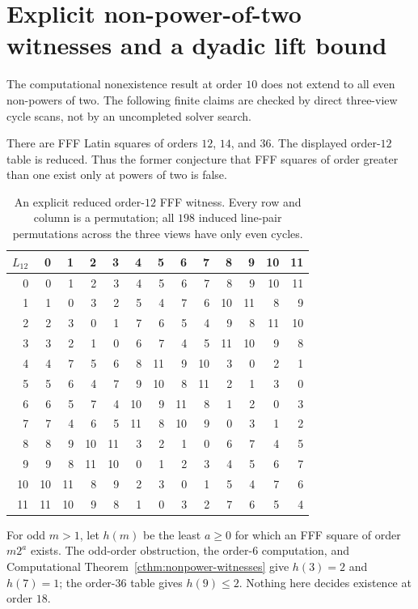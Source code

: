 \section{Explicit non-power-of-two witnesses and a dyadic lift bound}
\label{sec:nonpower-fff}

The computational nonexistence result at order $10$ does not extend to all even
non-powers of two.  The following finite claims are checked by direct
three-view cycle scans, not by an uncompleted solver search.

\begin{computationaltheorem}
\label{cthm:nonpower-witnesses}
There are FFF Latin squares of orders $12$, $14$, and $36$.  The displayed
order-$12$ table is reduced.  Thus the former conjecture that FFF squares
of order greater than one exist only at powers of two is false.
\end{computationaltheorem}

\begin{table}[ht]
\centering
\begingroup\scriptsize\setlength{\tabcolsep}{3pt}
\begin{tabular}{r|*{12}{r}}
$L_{12}$ & 0&1&2&3&4&5&6&7&8&9&10&11 \\ \hline
0  & 0&1&2&3&4&5&6&7&8&9&10&11 \\
1  & 1&0&3&2&5&4&7&6&10&11&8&9 \\
2  & 2&3&0&1&7&6&5&4&9&8&11&10 \\
3  & 3&2&1&0&6&7&4&5&11&10&9&8 \\
4  & 4&7&5&6&8&11&9&10&3&0&2&1 \\
5  & 5&6&4&7&9&10&8&11&2&1&3&0 \\
6  & 6&5&7&4&10&9&11&8&1&2&0&3 \\
7  & 7&4&6&5&11&8&10&9&0&3&1&2 \\
8  & 8&9&10&11&3&2&1&0&6&7&4&5 \\
9  & 9&8&11&10&0&1&2&3&4&5&6&7 \\
10 & 10&11&8&9&2&3&0&1&5&4&7&6 \\
11 & 11&10&9&8&1&0&3&2&7&6&5&4 \\
\end{tabular}
\endgroup
\caption{An explicit reduced order-$12$ FFF witness.  Every row and column
is a permutation; all $198$ induced line-pair permutations across the three
views have only even cycles.}
\label{tab:order12-witness}
\end{table}

For odd $m>1$, let $h(m)$ be the least $a\geq0$ for which an FFF square of
order $m2^a$ exists.  The odd-order obstruction, the order-$6$ computation,
and Computational Theorem~\ref{cthm:nonpower-witnesses} give
$h(3)=2$ and $h(7)=1$; the order-$36$ table gives $h(9)\leq2$.
Nothing here decides existence at order $18$.


